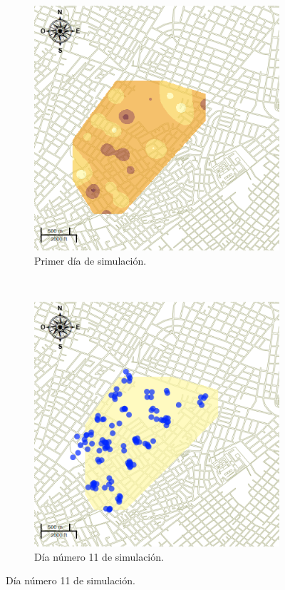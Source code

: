 \begin{figure}[!htbp]
    \centering
    \begin{subfigure}[b]{0.45\textwidth}
            \includegraphics[width=\textwidth]{capitulo-6/graphics/raster/temp-34-0.png}
            \caption{\label{fig:niveles-infestacion-34-a}Primer día de simulación.}
    \end{subfigure}
    ~~
    \begin{subfigure}[b]{0.45\textwidth}
            \includegraphics[width=\textwidth]{capitulo-6/graphics/raster/temp-34-10.png}
            \caption{\label{fig:niveles-infestacion-34-b}Día número 11 de simulación.}
    \end{subfigure}


\end{figure}
